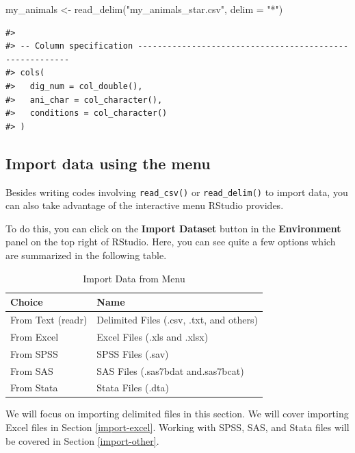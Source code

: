 \documentclass[
]{book}
\newenvironment{Shaded}{\begin{snugshade}}{\end{snugshade}}
\newcommand{\AttributeTok}[1]{\textcolor[rgb]{0.77,0.63,0.00}{#1}}
\newcommand{\FunctionTok}[1]{\textcolor[rgb]{0.00,0.00,0.00}{#1}}
\newcommand{\NormalTok}[1]{#1}
\newcommand{\OtherTok}[1]{\textcolor[rgb]{0.56,0.35,0.01}{#1}}
\newcommand{\StringTok}[1]{\textcolor[rgb]{0.31,0.60,0.02}{#1}}
\begin{document}
\begin{Shaded}
\begin{Highlighting}[]
\NormalTok{my\_animals }\OtherTok{\textless{}{-}} \FunctionTok{read\_delim}\NormalTok{(}\StringTok{"my\_animals\_star.csv"}\NormalTok{, }\AttributeTok{delim =} \StringTok{"*"}\NormalTok{)}
\end{Highlighting}
\end{Shaded}

\begin{verbatim}
#> 
#> -- Column specification --------------------------------------------------------
#> cols(
#>   dig_num = col_double(),
#>   ani_char = col_character(),
#>   conditions = col_character()
#> )
\end{verbatim}

\hypertarget{import-menu}{%
\subsection{Import data using the menu}\label{import-menu}}

Besides writing codes involving \texttt{read\_csv()} or \texttt{read\_delim()} to import data, you can also take advantage of the interactive menu RStudio provides.

To do this, you can click on the \textbf{Import Dataset} button in the \textbf{Environment} panel on the top right of RStudio. Here, you can see quite a few options which are summarized in the following table.

\begin{table}

\caption{\label{tab:importMenu}Import Data from Menu}
\centering
\begin{tabular}[t]{l|l}
\hline
Choice & Name\\
\hline
From Text (readr) & Delimited Files (.csv, .txt, and others)\\
\hline
From Excel & Excel Files (.xls and .xlsx)\\
\hline
From SPSS & SPSS Files (.sav)\\
\hline
From SAS & SAS Files (.sas7bdat and.sas7bcat)\\
\hline
From Stata & Stata Files (.dta)\\
\hline
\end{tabular}
\end{table}

We will focus on importing delimited files in this section. We will cover importing Excel files in Section \ref{import-excel}. Working with SPSS, SAS, and Stata files will be covered in Section \ref{import-other}.
\end{document}
